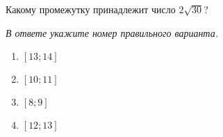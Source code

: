 Какому промежутку принадлежит число $2\sqrt{30}$?

\textit{В ответе укажите номер правильного варианта.}
\begin{multicols}{4}
	\begin{enumerate}[label=\arabic*)]
		\item $[13;14]$
		\item $[10;11]$
		\item $[8;9]$
		\item $[12;13]$
	\end{enumerate}
\end{multicols}